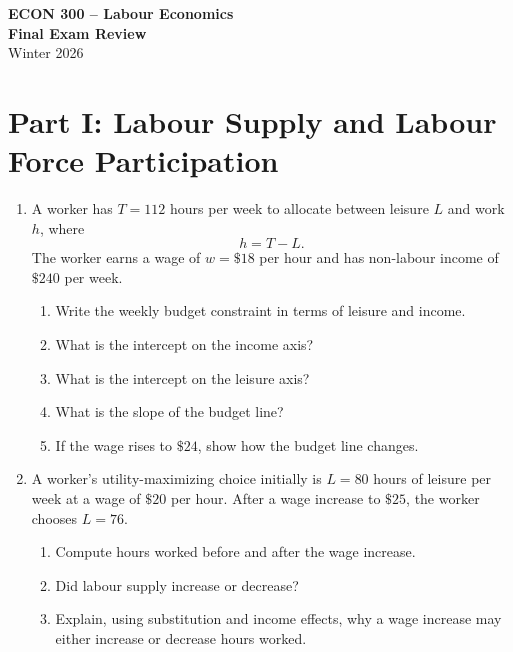 \documentclass[12pt]{article}
\begin{document}
\begin{center}
{\LARGE \textbf{ECON 300 -- Labour Economics}}\\[0.4em]
{\Large \textbf{Final Exam Review }}\\[0.4em]
Winter 2026
\end{center}

\vspace{0.5em}


\section*{Part I: Labour Supply and Labour Force Participation}

\begin{enumerate}

\item A worker has \(T=112\) hours per week to allocate between leisure \(L\) and work \(h\), where
\[
h=T-L.
\]
The worker earns a wage of \(w=\$18\) per hour and has non-labour income of \(\$240\) per week.

\begin{enumerate}[label=(\alph*)]
    \item Write the weekly budget constraint in terms of leisure and income.
    \item What is the intercept on the income axis?
    \item What is the intercept on the leisure axis?
    \item What is the slope of the budget line?
    \item If the wage rises to \(\$24\), show how the budget line changes.
\end{enumerate}

\item A worker's utility-maximizing choice initially is \(L=80\) hours of leisure per week at a wage of \(\$20\) per hour. After a wage increase to \(\$25\), the worker chooses \(L=76\).

\begin{enumerate}[label=(\alph*)]
    \item Compute hours worked before and after the wage increase.
    \item Did labour supply increase or decrease?
    \item Explain, using substitution and income effects, why a wage increase may either increase or decrease hours worked.
\end{enumerate}


\end{enumerate}
\end{document}
